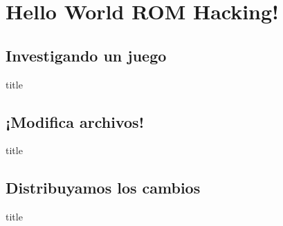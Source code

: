 \section{Hello World ROM Hacking!}
\subsection{Investigando un juego}
\begin{frame}{title}
\end{frame}

\subsection{¡Modifica archivos!}
\begin{frame}{title}
\end{frame}

\subsection{Distribuyamos los cambios}
\begin{frame}{title}
\end{frame}
